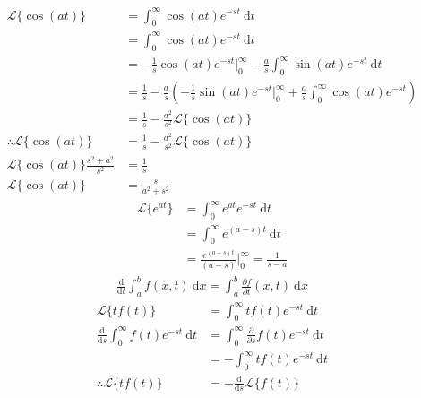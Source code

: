 \documentclass[a4paper,11pt]{article}
\theoremstyle{plain}
\theoremstyle{definition}
\newcommand{\dx}{\text{d}}
\newcommand{\del}{\partial}
\begin{document}
\begin{equation}
\begin{aligned}	
	\mathcal{L}\{\cos (at)\} &= \int_0^\infty \cos(at)e^{-st}\ \dx t\\
	 					   &= \int_0^\infty \cos(at)e^{-st}\ \dx t\\
						   &=-\frac{1}{s}\cos(at)e^{-st}\big|_0^\infty
	-\frac{a}{s}\int_0^\infty \sin(at)e^{-st}\ \dx t\\
	&= \frac{1}{s}-\frac{a}{s}\left(-\frac{1}{s}\sin(at)e^{-st}\big|_0^\infty
+\frac{a}{s}\int_0^\infty \cos(at)e^{-st}\right)\\
&=\frac{1}{s}-\frac{a^2}{s^2}\mathcal{L}\{\cos (at)\}\\
\therefore \mathcal{L}\{\cos (at)\} &=\frac{1}{s}
					-\frac{a^2}{s^2}\mathcal{L}\{\cos (at)\}\\
\mathcal{L}\{\cos (at)\}\frac{s^2+a^2}{s^2} &=\frac{1}{s}\\		
\mathcal{L}\{\cos (at)\} &= \frac{s}{a^2+s^2}
\end{aligned}	
\end{equation}
\begin{equation}
\begin{aligned}	
	\mathcal{L}\{e^{at}\} &= \int_0^\infty e^{at} e^{-st}\ \dx t\\
						 &= \int_0^\infty e^{(a-s)t}\ \dx t\\
						 &= \frac{e^{(a-s)t}}{(a-s)}\bigg|_0^\infty
	= \frac{1}{s-a}
\end{aligned}	
\end{equation}
\begin{equation}
\begin{aligned}	
	\frac{\dx}{\dx t}\int_a^b f(x,t)\ \dx x = 
	\int_a^b \frac{\del f}{\del t}(x,t)\ \dx x
\end{aligned}	
\end{equation}
\begin{equation}
\begin{aligned}	
	\mathcal{L}\{tf(t)\} &= \int_0^\infty tf(t)e^{-st}\ \dx t\\
	\frac{\dx}{\dx s} \int_0^\infty f(t)e^{-st}\ \dx t
	&=\int_0^\infty \frac{\del}{\del s} f(t)e^{-st}\ \dx t\\
	&=-\int_0^\infty tf(t)e^{-st}\ \dx t\\
	\therefore \mathcal{L}\{tf(t)\}&=-\frac{\dx }{\dx s}\mathcal{L}\{f(t)\}
\end{aligned}	
\end{equation}
\end{document}
